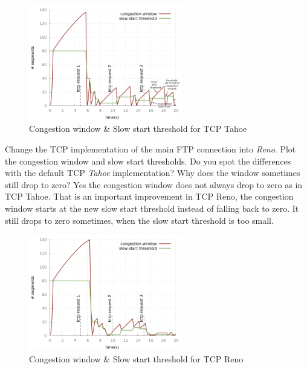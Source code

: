 \documentclass[9pt, a4paper, oneside]{article}
\makeatletter
\renewcommand\subsection{\@startsection{subsection}{2}{\z@}
    {-3.5ex \@plus -1ex \@minus -.2ex}
    {2.3ex \@plus.2ex}
    {\normalfont\normalsize\bfseries}}
\makeatother
\begin{document}
\begin{figure}[h]
\centering
\includegraphics[width=0.6\textwidth]{ftp_3http_wnd_thresh.png}
\caption{Congestion window \& Slow start threshold for TCP Tahoe}
\label{Tahoe}
\end{figure}

\subsection{Change the TCP implementation of the main FTP connection into
    \emph{Reno}.
    Plot the congestion window and slow start thresholds.
    Do you spot the differences with the default TCP \emph{Tahoe}
    implementation?
    Why does the window sometimes still drop to zero?}
Yes the congestion window does not always drop to zero as in TCP Tahoe.
That is an important improvement in TCP Reno, the congestion window starts at
the new slow start threshold instead of falling back to zero.
It still drops to zero sometimes, when the slow start threshold is too small.

\begin{figure}[h]
\centering
\includegraphics[width=0.6\textwidth]{ftp_3http_wnd_thresh_Reno.png}
\caption{Congestion window \& Slow start threshold for TCP Reno}
\label{Reno}
\end{figure}

\newpage


\end{document}
